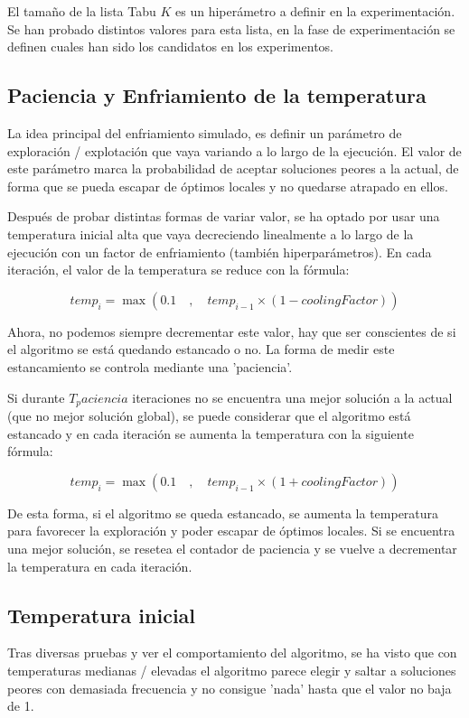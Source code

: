 \documentclass[11pt,spanish,listoffigures,listoftables]{tfgetsinf}
\begin{document}
El tamaño de la lista Tabu $K$ es un hiperámetro a definir en la experimentación. Se han probado distintos valores para esta lista, en la fase de experimentación se definen cuales han sido los candidatos en los experimentos. 

\subsection{Paciencia y Enfriamiento de la temperatura}
La idea principal del enfriamiento simulado, es definir un parámetro de exploración / explotación que vaya variando a lo largo de la ejecución. El valor de este parámetro marca la probabilidad de aceptar soluciones peores a la actual, de forma que se pueda escapar de óptimos locales y no quedarse atrapado en ellos.

Después de probar distintas formas de variar valor, se ha optado por usar una temperatura inicial alta que vaya decreciendo linealmente a lo largo de la ejecución con un factor de enfriamiento (también hiperparámetros). En cada iteración, el valor de la temperatura se reduce con la fórmula:

$$
temp_i = \max(0.1\quad, \quad temp_{i-1}\times (1 - coolingFactor))
$$

Ahora, no podemos siempre decrementar este valor, hay que ser conscientes de si el algoritmo se está quedando estancado o no. La forma de medir este estancamiento se controla mediante una 'paciencia'. 

Si durante $T_paciencia$ iteraciones no se encuentra una mejor solución a la actual (que no mejor solución global), se puede considerar que el algoritmo está estancado y en cada iteración se aumenta la temperatura con la siguiente fórmula:

$$
temp_i = \max(0.1\quad, \quad temp_{i-1} \times (1 + coolingFactor))
$$

De esta forma, si el algoritmo se queda estancado, se aumenta la temperatura para favorecer la exploración y poder escapar de óptimos locales. Si se encuentra una mejor solución, se resetea el contador de paciencia y se vuelve a decrementar la temperatura en cada iteración.

\subsection{Temperatura inicial}
Tras diversas pruebas y ver el comportamiento del algoritmo, se ha visto que con temperaturas medianas / elevadas el algoritmo parece elegir y saltar a soluciones peores con demasiada frecuencia y no consigue 'nada' hasta que el valor no baja de 1. 
\end{document}
